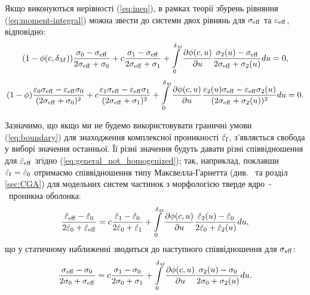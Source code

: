 \documentclass[14pt,twoside]{vakthesis}
\begin{document}
Якщо виконуються нерівності (\ref{eq:ineq}), в рамках теорії збурень рівняння (\ref{eq:moment-integral}) можна звести до системи двох рівнянь для $\sigma_{\rm eff}$ та $\varepsilon_{\rm eff}$, відповідно:
\begin{equation}\label{eq:general_Contlayer_sigma}
(1 - \phi(c,\delta_M)) \frac{\sigma_0 - \sigma_{\rm eff}}{2\sigma_{\rm eff} + \sigma_0}
+ c \frac{\sigma_1 - \sigma_{\rm eff}}{2\sigma_{\rm eff} + \sigma_1}
+ \int\limits_0^{\delta_M} \frac{\partial \phi(c,u)}{\partial u} \frac{\sigma_2 (u) - \sigma_{\rm eff}}{2\sigma_{\rm eff} + \sigma_2 (u)} du = 0,
\end{equation}
\begin{equation}\label{eq:general_Contlayer_eps}
(1 - \phi) \frac{\varepsilon_0\sigma_{\rm eff} - \varepsilon_{\rm eff}\sigma_0}{(2\sigma_{\rm eff} + \sigma_{0})^2} 
+ c \frac{\varepsilon_1\sigma_{\rm eff} - \varepsilon_{\rm eff}\sigma_1}{(2\sigma_{\rm eff} + \sigma_1)^2}
+ \int\limits_0^{\delta_M} \frac{\partial \phi(c,u)}{\partial u} \frac{\varepsilon_2 (u)\sigma_{\rm eff} - \varepsilon_{\rm eff}\sigma_2 (u)}{(2\sigma_{\rm eff} + \sigma_2 (u))^2} du = 0.
\end{equation}

Зазначимо, що якщо ми не будемо використовувати граничні
умови (\ref{eq:boundary}) для знаходження комплексної проникності $\hat{\varepsilon}_{\rm f}$, з'являється свобода у виборі значення останньої. Її різні значення будуть давати
різні співвідношення для $\hat{\varepsilon}_{\rm eff}$ згідно
(\ref{eq:general_not_homogenized}); так, наприклад, поклавши
$\hat{\varepsilon}_{\rm f} = \hat{\varepsilon}_0$
отримаємо співвідношення типу Максвелла-Гарнетта 
(див.~\cite{Sushko2007,Sushko2009,Sushko2017} та розділ \ref{sec:CGA}) для модельних систем частинок з морфологією тверде ядро~-~проникна оболонка:
\begin{equation}\label{eq:MG-core-shell}
\frac{\hat{\varepsilon}_{\rm eff} - \hat{\varepsilon}_0}{2\hat{\varepsilon}_0 + \hat{\varepsilon}_{\rm eff}} = 
c \frac{\hat{\varepsilon}_1 - \hat{\varepsilon}_0}{2\hat{\varepsilon}_0 + \hat{\varepsilon}_1}
+ \int\limits_0^{\delta_M} \frac{\partial \phi(c,u)}{\partial u} \frac{\hat{\varepsilon}_2 (u) - \hat{\varepsilon}_0}{2\hat{\varepsilon}_0 + \hat{\varepsilon}_2 (u)} du,
\end{equation}
що у статичному наближенні зводиться до наступного співвідношення для
$\sigma_{\rm eff}$:
\begin{equation}\label{eq:MG-core-shell-sigma}
\frac{\sigma_{\rm eff} - \sigma_0}{2\sigma_0 + \sigma_{\rm eff}} = 
c \frac{\sigma_1 - \sigma_0}{2\sigma_0 + \sigma_1}
+ \int\limits_0^{\delta_M} \frac{\partial \phi(c,u)}{\partial u} \frac{\sigma_2 (u) - \sigma_0}{2\sigma_0 + \sigma_2 (u)} du.
\end{equation}
\end{document}
